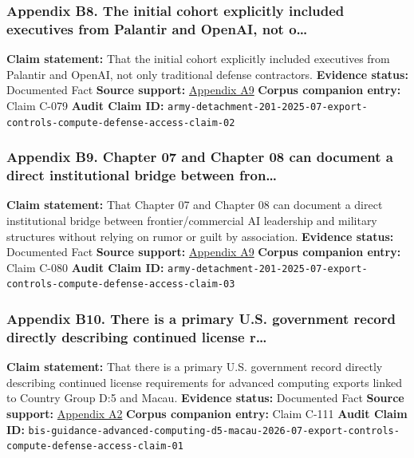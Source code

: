 \documentclass[
  american,
  11pt,
  letterpaper,
]{article}
\begin{document}
\subsubsection{Appendix B8. The initial cohort explicitly included
executives from Palantir and OpenAI, not
o\ldots{}}\label{ch-07-appendix-b8-the-initial-cohort-explicitly-included-executives-from-palantir-and-openai-not-o}

\textbf{Claim statement:} That the initial cohort explicitly included
executives from Palantir and OpenAI, not only traditional defense
contractors. \textbf{Evidence status:} Documented Fact \textbf{Source
support:}
\hyperref[ch-07-appendix-a9-army-launches-detachment-201-executive-innovation-corps-to-drive-tech-transformation]{Appendix
A9} \textbf{Corpus companion entry:} Claim C-079 \textbf{Audit Claim
ID:}
\texttt{army-detachment-201-2025-07-export-controls-compute-defense-access-claim-02}

\subsubsection{Appendix B9. Chapter 07 and Chapter 08 can document a
direct institutional bridge between
fron\ldots{}}\label{ch-07-appendix-b9-chapter-07-and-chapter-08-can-document-a-direct-institutional-bridge-between-fron}

\textbf{Claim statement:} That Chapter 07 and Chapter 08 can document a
direct institutional bridge between frontier/commercial AI leadership
and military structures without relying on rumor or guilt by
association. \textbf{Evidence status:} Documented Fact \textbf{Source
support:}
\hyperref[ch-07-appendix-a9-army-launches-detachment-201-executive-innovation-corps-to-drive-tech-transformation]{Appendix
A9} \textbf{Corpus companion entry:} Claim C-080 \textbf{Audit Claim
ID:}
\texttt{army-detachment-201-2025-07-export-controls-compute-defense-access-claim-03}

\subsubsection{Appendix B10. There is a primary U.S. government record
directly describing continued license
r\ldots{}}\label{ch-07-appendix-b10-there-is-a-primary-u-s-government-record-directly-describing-continued-license-r}

\textbf{Claim statement:} That there is a primary U.S. government record
directly describing continued license requirements for advanced
computing exports linked to Country Group D:5 and Macau.
\textbf{Evidence status:} Documented Fact \textbf{Source support:}
\hyperref[ch-07-appendix-a2-guidance-regarding-enforcement-of-license-requirements-for-advanced-computing-items-for-entities-headquartered-in-country-group-d-5-and-macau]{Appendix
A2} \textbf{Corpus companion entry:} Claim C-111 \textbf{Audit Claim
ID:}
\texttt{bis-guidance-advanced-computing-d5-macau-2026-07-export-controls-compute-defense-access-claim-01}
\end{document}
